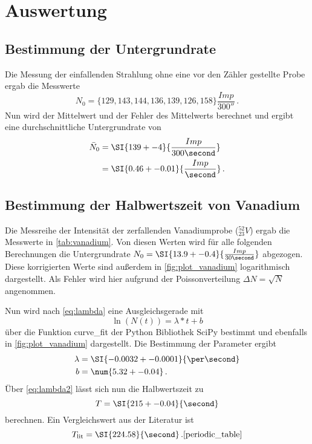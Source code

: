 \section{Auswertung}
\label{sec:Auswertung}

\subsection{Bestimmung der Untergrundrate}
\label{ssec:auswertung_untergrund}

Die Messung der einfallenden Strahlung ohne eine vor den Zähler gestellte Probe ergab die Messwerte
\begin{equation*}
    N_0 = \{129, 143, 144, 136, 139, 126, 158\} \si{\frac{Imp}{300\second}} \, .
\end{equation*}
Nun wird der Mittelwert und der Fehler des Mittelwerts berechnet und ergibt eine durchschnittliche Untergrundrate von
\begin{align*}
    \bar{N}_0 &= \SI{139+-4}{\frac{Imp}{300\second}} \\
              &= \SI{0.46+-0.01}{\frac{Imp}{\second}} \, .
\end{align*}

\subsection{Bestimmung der Halbwertszeit von Vanadium}
\label{ssec:auswertung_vanadium}

Die Messreihe der Intensität der zerfallenden Vanadiumprobe ($ ^{52}_{23}V$) ergab die Messwerte in \autoref{tab:vanadium}. 
Von diesen Werten wird für alle folgenden Berechnungen die Untergrundrate $N_0=\SI{13.9+-0.4}{\frac{Imp}{30\second}}$ abgezogen.
Diese korrigierten Werte sind außerdem in \autoref{fig:plot_vanadium} logarithmisch dargestellt.
Als Fehler wird hier aufgrund der Poissonverteilung $\Delta N = \sqrt{N}$ angenommen.

Nun wird nach \autoref{eq:lambda} eine Ausgleichsgerade mit 
\begin{equation}
    \ln(N(t)) = \lambda*t+b
    \label{eq:ausgleichsgerade}
\end{equation}
über die Funktion curve\_fit der Python Bibliothek SciPy bestimmt und ebenfalls in \autoref{fig:plot_vanadium} dargestellt.\cite{scipy}
Die Bestimmung der Parameter ergibt
\begin{align*}
    \lambda &= \SI{-0.0032+-0.0001}{\per\second} \\
    b &= \num{5.32+-0.04} \, .
\end{align*}
Über \autoref{eq:lambda2} lässt sich nun die Halbwertszeit zu
\begin{equation*}
    T = \SI{215+-0.04}{\second}
\end{equation*}
berechnen.
Ein Vergleichswert aus der Literatur ist
\begin{equation*}
    T_\text{lit} = \SI{224.58}{\second} \, .\text{\cite{periodic_table}}
\end{equation*}


